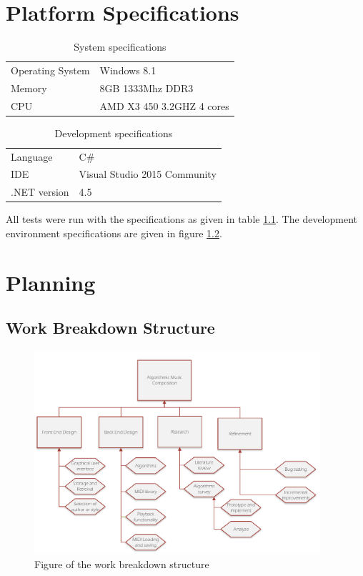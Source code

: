 \chapter{Platform Specifications}
\begin{table}[h!]
  \centering
  \caption{System specifications}
    \begin{tabular}{l|l}
    \toprule
    Operating System & Windows 8.1 \\
    Memory & 8GB 1333Mhz DDR3 \\
    CPU   & AMD X3 450 3.2GHZ 4 cores \\
    \bottomrule
    \end{tabular}%
  \label{tab:systemspecs}%
\end{table}%

\begin{table}[htbp]
  \centering
  \caption{Development specifications}
    \begin{tabular}{l|l}
    \toprule
    Language & C\# \\
    IDE   & Visual Studio 2015 Community \\
    .NET version & 4.5 \\
    \bottomrule
    \end{tabular}%
  \label{tab:languagespecs}%
\end{table}%


All tests were run with the specifications as given in table \ref{tab:systemspecs}. The development environment specifications are given in figure \ref{tab:languagespecs}.


\chapter{Planning}



\section{Work Breakdown Structure}
\begin{figure}
\centerline{\includegraphics[width=400px]{../images/wbs.pdf}}
\caption{Figure of the work breakdown structure}
\label{ims:sdp}
\end{figure}

